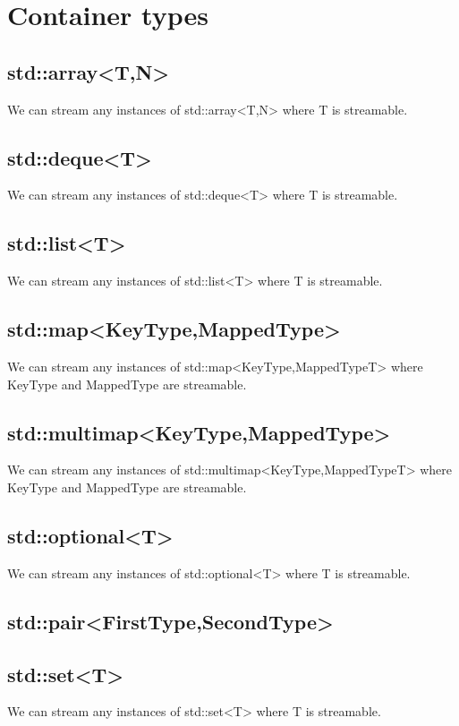 \chapter{Container types}

\section{\ttfamily std::array<T,N>}
We can stream any instances of {\ttfamily std::array<T,N>} where
{\ttfamily T} is streamable.

\section{\ttfamily std::deque<T>}
We can stream any instances of {\ttfamily std::deque<T>} where
{\ttfamily T} is streamable.

\section{\ttfamily std::list<T>}
We can stream any instances of {\ttfamily std::list<T>} where
{\ttfamily T} is streamable.

\section{\ttfamily std::map<KeyType,MappedType>}
We can stream any instances of {\ttfamily std::map<KeyType,MappedTypeT>}
where {\ttfamily KeyType} and {\ttfamily MappedType} are streamable.

\section{\ttfamily std::multimap<KeyType,MappedType>}
We can stream any instances of {\ttfamily std::multimap<KeyType,MappedTypeT>}
where {\ttfamily KeyType} and {\ttfamily MappedType} are streamable.

\section{\ttfamily std::optional<T>}
We can stream any instances of {\ttfamily std::optional<T>} where
{\ttfamily T} is streamable.

\section{\ttfamily std::pair<FirstType,SecondType>}

\section{\ttfamily std::set<T>}
We can stream any instances of {\ttfamily std::set<T>} where
{\ttfamily T} is streamable.

